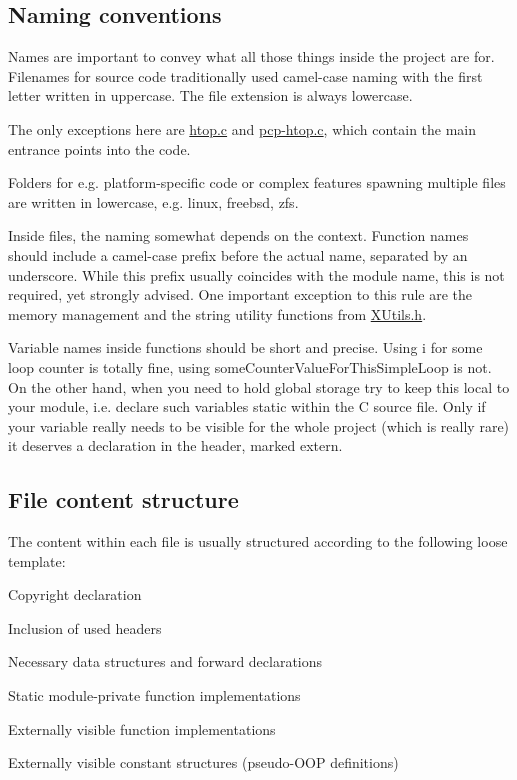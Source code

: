 \subsection*{Naming conventions }

Names are important to convey what all those things inside the project are for. Filenames for source code traditionally used camel-\/case naming with the first letter written in uppercase. The file extension is always lowercase.

The only exceptions here are {\ttfamily \hyperlink{htop_8c}{htop.\+c}} and {\ttfamily \hyperlink{pcp-htop_8c}{pcp-\/htop.\+c}}, which contain the main entrance points into the code.

Folders for e.\+g. platform-\/specific code or complex features spawning multiple files are written in lowercase, e.\+g. {\ttfamily linux}, {\ttfamily freebsd}, {\ttfamily zfs}.

Inside files, the naming somewhat depends on the context. Function names should include a camel-\/case prefix before the actual name, separated by an underscore. While this prefix usually coincides with the module name, this is not required, yet strongly advised. One important exception to this rule are the memory management and the string utility functions from {\ttfamily \hyperlink{XUtils_8h}{X\+Utils.\+h}}.

Variable names inside functions should be short and precise. Using {\ttfamily i} for some loop counter is totally fine, using {\ttfamily some\+Counter\+Value\+For\+This\+Simple\+Loop} is not. On the other hand, when you need to hold global storage try to keep this local to your module, i.\+e. declare such variables {\ttfamily static} within the C source file. Only if your variable really needs to be visible for the whole project (which is really rare) it deserves a declaration in the header, marked {\ttfamily extern}.

\subsection*{File content structure }

The content within each file is usually structured according to the following loose template\+:


\begin{DoxyItemize}
\item Copyright declaration
\item Inclusion of used headers
\item Necessary data structures and forward declarations
\item Static module-\/private function implementations
\item Externally visible function implementations
\item Externally visible constant structures (pseudo-\/\+O\+OP definitions)
\end{DoxyItemize}

